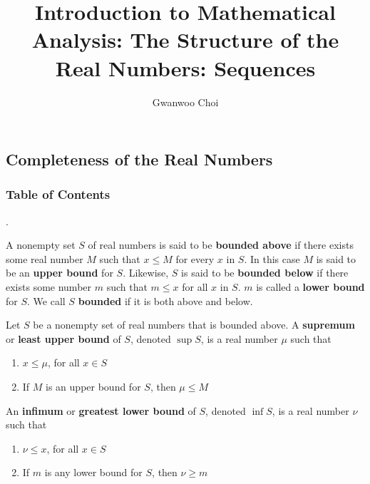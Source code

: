 \documentclass[8pt]{beamer}
\title{Introduction to Mathematical Analysis: The Structure of the Real Numbers: Sequences}
\author{Gwanwoo Choi}
\newcommand{\tb}[1]{\textbf{#1}}
\begin{document}

\begin{frame}
    \titlepage
\end{frame}

\subsection{Completeness of the Real Numbers}
\begingroup
    \begin{frame}
        \frametitle{Table of Contents}
        \tableofcontents[currentsubsection]
    \end{frame}
\endgroup


\begin{frame}{.}
    \begin{definition}
        A nonempty set $S$ of real numbers is said to be \tb{bounded above} if there exists some real number $M$ such that $x \leq M$ for every $x$ in $S$.
        In this case $M$ is said to be an \tb{upper bound} for $S$.
        Likewise, $S$ is said to be \tb{bounded below} if there exists some number $m$ such that $m \leq x$ for all $x$ in $S$.
        $m$ is called a \tb{lower bound} for $S$.
        We call $S$ \tb{bounded} if it is both above and below.
    \end{definition}

    \begin{definition}
        Let $S$ be a nonempty set of real numbers that is bounded above.
        A \tb{supremum} or \tb{least upper bound} of $S$, denoted $\sup S$, is a real number $\mu$ such that
        \begin{enumerate}
            \item $x \leq \mu$, for all $x \in S$
            \item If $M$ is an upper bound for $S$, then $\mu \leq M$
        \end{enumerate}

        An \tb{infimum} or \tb{greatest lower bound} of $S$, denoted $\inf S$, is a real number $\nu$ such that
        \begin{enumerate}
            \item $\nu \leq x$, for all $x \in S$
            \item If $m$ is any lower bound for $S$, then $\nu \geq m$
        \end{enumerate}
    \end{definition}
\end{frame}
\end{document}
